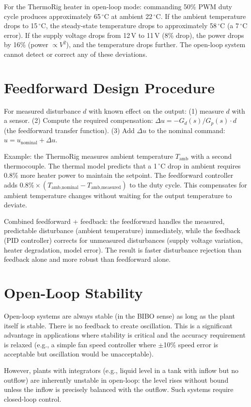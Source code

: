 \documentclass[11pt,letterpaper,twoside,openany]{book}
\newcommand{\degC}{\ensuremath{{}^{\circ}\text{C}}}
\begin{document}
For the ThermoRig heater in open-loop mode: commanding 50\% PWM duty cycle produces approximately 65\,\degC{} at ambient 22\,\degC{}. If the ambient temperature drops to 15\,\degC{}, the steady-state temperature drops to approximately 58\,\degC{} (a 7\,\degC{} error). If the supply voltage drops from 12\,V to 11\,V (8\% drop), the power drops by 16\% (power $\propto V^2$), and the temperature drops further. The open-loop system cannot detect or correct any of these deviations.

\section{Feedforward Design Procedure}
For measured disturbance $d$ with known effect on the output: (1) measure $d$ with a sensor. (2) Compute the required compensation: $\Delta u = -G_d(s)/G_p(s) \cdot d$ (the feedforward transfer function). (3) Add $\Delta u$ to the nominal command: $u = u_{\text{nominal}} + \Delta u$.

Example: the ThermoRig measures ambient temperature $T_{\text{amb}}$ with a second thermocouple. The thermal model predicts that a 1\,\degC{} drop in ambient requires 0.8\% more heater power to maintain the setpoint. The feedforward controller adds $0.8\% \times (T_{\text{amb,nominal}} - T_{\text{amb,measured}})$ to the duty cycle. This compensates for ambient temperature changes without waiting for the output temperature to deviate.

Combined feedforward + feedback: the feedforward handles the measured, predictable disturbance (ambient temperature) immediately, while the feedback (PID controller) corrects for unmeasured disturbances (supply voltage variation, heater degradation, model error). The result is faster disturbance rejection than feedback alone and more robust than feedforward alone.

\section{Open-Loop Stability}
Open-loop systems are always stable (in the BIBO sense) as long as the plant itself is stable. There is no feedback to create oscillation. This is a significant advantage in applications where stability is critical and the accuracy requirement is relaxed (e.g., a simple fan speed controller where $\pm$10\% speed error is acceptable but oscillation would be unacceptable).

However, plants with integrators (e.g., liquid level in a tank with inflow but no outflow) are inherently unstable in open-loop: the level rises without bound unless the inflow is precisely balanced with the outflow. Such systems require closed-loop control.
\end{document}

